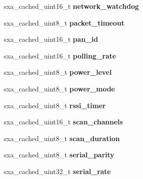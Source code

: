\begin{DoxyCompactItemize}
sxa\+\_\+cached\+\_\+uint16\+\_\+t {\bfseries network\+\_\+watchdog}
\item 
\mbox{\label{structsxa__node__t_a3a4e03433345119bd0bb6e347a7424a2}} 
sxa\+\_\+cached\+\_\+uint8\+\_\+t {\bfseries packet\+\_\+timeout}
\item 
\mbox{\label{structsxa__node__t_a90ab3737ab9066793e4bce19727d6552}} 
sxa\+\_\+cached\+\_\+uint16\+\_\+t {\bfseries pan\+\_\+id}
\item 
\mbox{\label{structsxa__node__t_aaba7c04f6808b9ca181417fa48a4536e}} 
sxa\+\_\+cached\+\_\+uint16\+\_\+t {\bfseries polling\+\_\+rate}
\item 
\mbox{\label{structsxa__node__t_a8d8ab853c4db7da7889ddf177619eef8}} 
sxa\+\_\+cached\+\_\+uint8\+\_\+t {\bfseries power\+\_\+level}
\item 
\mbox{\label{structsxa__node__t_a24a7cf27e344d37b32c65c7be8c9c9e7}} 
sxa\+\_\+cached\+\_\+uint8\+\_\+t {\bfseries power\+\_\+mode}
\item 
\mbox{\label{structsxa__node__t_a19e007d8d40744632be14e3791dabde0}} 
sxa\+\_\+cached\+\_\+uint8\+\_\+t {\bfseries rssi\+\_\+timer}
\item 
\mbox{\label{structsxa__node__t_af32b39eca3921c88cbe56528343fa7fc}} 
sxa\+\_\+cached\+\_\+uint16\+\_\+t {\bfseries scan\+\_\+channels}
\item 
\mbox{\label{structsxa__node__t_aa80aa88a7abf5d8d659bb026c0e900fb}} 
sxa\+\_\+cached\+\_\+uint8\+\_\+t {\bfseries scan\+\_\+duration}
\item 
\mbox{\label{structsxa__node__t_a19676a93e32db8ba76b14f8381b088ad}} 
sxa\+\_\+cached\+\_\+uint8\+\_\+t {\bfseries serial\+\_\+parity}
\item 
\mbox{\label{structsxa__node__t_aa826e8539b193121c88bec64543fbcc6}} 
sxa\+\_\+cached\+\_\+uint32\+\_\+t {\bfseries serial\+\_\+rate}
\item 
\mbox{\label{structsxa__node__t_ae9676b0bfe7646b4b58db600d0e3a0a6}} 

\end{DoxyCompactItemize}

